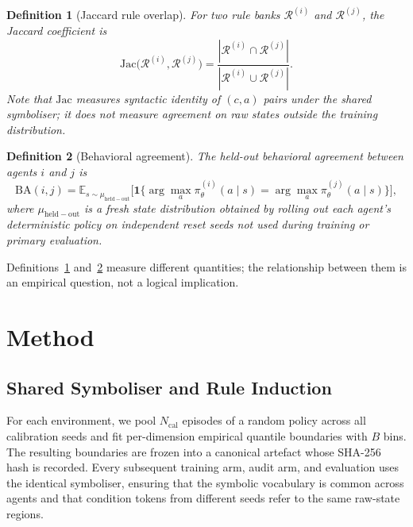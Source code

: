 \documentclass[12pt]{article}
\newtheorem{definition}{Definition}
\newcommand{\cR}{\mathcal{R}}       %
\newcommand{\piN}{\pi_{\theta}}     %
\newcommand{\Jac}{\mathrm{Jac}}     %
\begin{document}
\begin{definition}[Jaccard rule overlap]
\label{def:jaccard}
For two rule banks $\cR^{(i)}$ and $\cR^{(j)}$, the Jaccard coefficient is
\begin{equation}
\label{eq:jaccard}
\Jac\bigl(\cR^{(i)}, \cR^{(j)}\bigr)
  = \frac{|\cR^{(i)} \cap \cR^{(j)}|}{|\cR^{(i)} \cup \cR^{(j)}|}.
\end{equation}
Note that $\Jac$ measures syntactic identity of $(c,a)$ pairs under the
shared symboliser; it does not measure agreement on raw states outside
the training distribution.
\end{definition}

\begin{definition}[Behavioral agreement]
\label{def:bahavior_agree}
The held-out behavioral agreement between agents $i$ and $j$ is
\begin{equation}
\label{eq:behavioral_agree}
\mathrm{BA}(i, j)
  = \mathbb{E}_{s \sim \mu_{\mathrm{held-out}}}
    \bigl[\mathbf{1}\bigl\{\arg\max_a \piN^{(i)}(a \mid s)
          = \arg\max_a \piN^{(j)}(a \mid s)\bigr\}\bigr],
\end{equation}
where $\mu_{\mathrm{held-out}}$ is a fresh state distribution obtained by
rolling out each agent's deterministic policy on independent reset seeds
not used during training or primary evaluation.
\end{definition}

Definitions~\ref{def:jaccard} and~\ref{def:bahavior_agree} measure
different quantities; the relationship between them is an empirical question,
not a logical implication.

\section{Method}
\label{sec:method}

\subsection{Shared Symboliser and Rule Induction}
\label{sec:method:symboliser}

For each environment, we pool $N_{\mathrm{cal}}$ episodes of a
random policy across all calibration seeds and fit per-dimension empirical
quantile boundaries with $B$ bins.
The resulting boundaries are frozen into a canonical artefact whose
SHA-256 hash is recorded.
Every subsequent training arm, audit arm, and evaluation uses the identical
symboliser, ensuring that the symbolic vocabulary is common across agents
and that condition tokens from different seeds refer to the same raw-state
regions.
\end{document}
